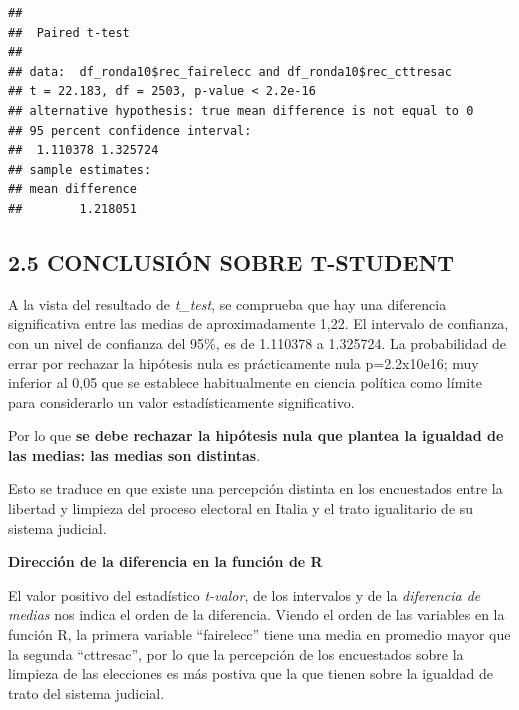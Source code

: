 \documentclass[
  12 pt,
  a4paper,
]{article}
\newenvironment{Shaded}{\begin{snugshade}}{\end{snugshade}}
\newcommand{\AttributeTok}[1]{\textcolor[rgb]{0.13,0.29,0.53}{#1}}
\newcommand{\DecValTok}[1]{\textcolor[rgb]{0.00,0.00,0.81}{#1}}
\newcommand{\FunctionTok}[1]{\textcolor[rgb]{0.13,0.29,0.53}{\textbf{#1}}}
\newcommand{\NormalTok}[1]{#1}
\newcommand{\SpecialCharTok}[1]{\textcolor[rgb]{0.81,0.36,0.00}{\textbf{#1}}}
\newcommand{\StringTok}[1]{\textcolor[rgb]{0.31,0.60,0.02}{#1}}
\begin{document}
\begin{Shaded}
\end{Shaded}

\begin{verbatim}
## 
##  Paired t-test
## 
## data:  df_ronda10$rec_fairelecc and df_ronda10$rec_cttresac
## t = 22.183, df = 2503, p-value < 2.2e-16
## alternative hypothesis: true mean difference is not equal to 0
## 95 percent confidence interval:
##  1.110378 1.325724
## sample estimates:
## mean difference 
##        1.218051
\end{verbatim}

\subsection{2.5 CONCLUSIÓN SOBRE
T-STUDENT}\label{conclusiuxf3n-sobre-t-student}

A la vista del resultado de \emph{t\_test}, se comprueba que hay una
diferencia significativa entre las medias de aproximadamente 1,22. El
intervalo de confianza, con un nivel de confianza del 95\%, es de
1.110378 a 1.325724. La probabilidad de errar por rechazar la hipótesis
nula es prácticamente nula p=2.2x10e16; muy inferior al 0,05 que se
establece habitualmente en ciencia política como límite para
considerarlo un valor estadísticamente significativo.

Por lo que \textbf{se debe rechazar la hipótesis nula que plantea la
igualdad de las medias: las medias son distintas}.

Esto se traduce en que existe una percepción distinta en los encuestados
entre la libertad y limpieza del proceso electoral en Italia y el trato
igualitario de su sistema judicial.

\textbf{Dirección de la diferencia en la función de R}

El valor positivo del estadístico \emph{t-valor}, de los intervalos y de
la \emph{diferencia de medias} nos indica el orden de la diferencia.
Viendo el orden de las variables en la función R, la primera variable
``fairelecc'' tiene una media en promedio mayor que la segunda
``cttresac'', por lo que la percepción de los encuestados sobre la
limpieza de las elecciones es más postiva que la que tienen sobre la
igualdad de trato del sistema judicial.
\end{document}
